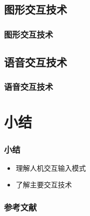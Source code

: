 \documentclass{beamer}
\newcommand{\fullPageImage}[2]{
	{
		\usebackgroundtemplate{\texttt{[image: \#1]}}
		\frame[plain]{#2}
	}
}
\begin{document}
\fullPageImage{images/socket.jpg}{\transwipe}
\fullPageImage{images/epoll.jpg}{\transwipe}
\fullPageImage{images/tornado.jpg}{\transwipe}

\subsection{图形交互技术}
\begin{frame}
	\frametitle{图形交互技术}

\end{frame}

\subsection{语音交互技术}
\begin{frame}
	\frametitle{语音交互技术}

\end{frame}

%

\section{小结}
\begin{frame}
	\frametitle{小结}
	\begin{itemize}
		\item 理解人机交互输入模式
		\item 了解主要交互技术
	\end{itemize}
\end{frame}
 
\begin{frame}
	\frametitle{参考文献}
	
	
\end{frame}
\end{document}
